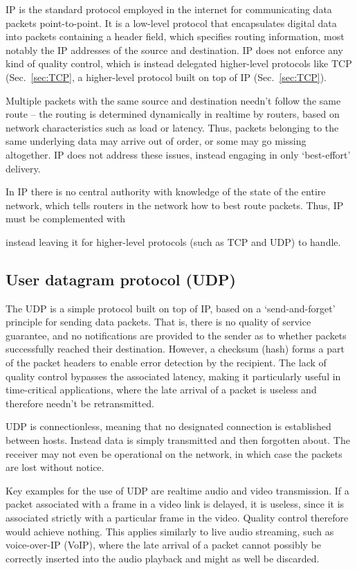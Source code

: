 \documentclass[aps,rmp,twocolumn,amsmath,amssymb,nofootinbib,superscriptaddress,longbibliography,floatfix]{revtex4-1}
\begin{document}
IP is the standard protocol employed in the internet for communicating data packets point-to-point. It is a low-level protocol that encapsulates digital data into packets containing a header field, which specifies routing information, most notably the IP addresses of the source and destination. IP does not enforce any kind of quality control, which is instead delegated higher-level protocols like TCP (Sec.~\ref{sec:TCP}, a higher-level protocol built on top of IP (Sec.~\ref{sec:TCP}).

Multiple packets with the same source and destination needn't follow the same route -- the routing is determined dynamically in realtime by routers, based on network characteristics such as load or latency. Thus, packets belonging to the same underlying data may arrive out of order, or some may go missing altogether. IP does not address these issues, instead engaging in only `best-effort' delivery. 

In IP there is no central authority with knowledge of the state of the entire network, which tells routers in the network how to best route packets. Thus, IP must be complemented with  

instead leaving it for higher-level protocols (such as TCP and UDP) to handle.

%
%

\subsection{User datagram protocol (UDP)}

The UDP is a simple protocol built on top of IP, based on a `send-and-forget' principle for sending data packets. That is, there is no quality of service guarantee, and no notifications are provided to the sender as to whether packets successfully reached their destination. However, a checksum (hash) forms a part of the packet headers to enable error detection by the recipient. The lack of quality control bypasses the associated latency, making it particularly useful in time-critical applications, where the late arrival of a packet is useless and therefore needn't be retransmitted.

UDP is connectionless, meaning that no designated connection is established between hosts. Instead data is simply transmitted and then forgotten about. The receiver may not even be operational on the network, in which case the packets are lost without notice.

Key examples for the use of UDP are realtime audio and video transmission. If a packet associated with a frame in a video link is delayed, it is useless, since it is associated strictly with a particular frame in the video. Quality control therefore would achieve nothing. This applies similarly to live audio streaming, such as voice-over-IP (VoIP), where the late arrival of a packet cannot possibly be correctly inserted into the audio playback and might as well be discarded.
\end{document}
